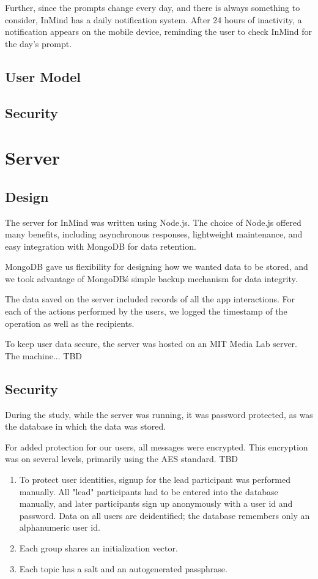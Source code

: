       Further, since the prompts change every day,
      and there is always something to consider, InMind has a daily notification system.
      After 24 hours of inactivity, a notification appears on the mobile device,
      reminding the user to check InMind for the day's prompt.

    \subsection{User Model}

    \subsection{Security}


  \section{Server}
    \subsection{Design}
      The server for InMind was written using Node.js.
      The choice of Node.js offered many benefits, including asynchronous responses,
      lightweight maintenance, and easy integration with MongoDB for data retention.

      MongoDB gave us flexibility for designing how we wanted data to be stored,
      and we took advantage of MongoDB\'s simple backup mechanism for data integrity.

      The data saved on the server included records of all the app interactions.
      For each of the actions performed by the users,
      we logged the timestamp of the operation as well as the recipients.

      To keep user data secure, the server was hosted on an MIT Media Lab server.
      The machine... TBD

    \subsection{Security}
      During the study, while the server was running, it was password protected,
      as was the database in which the data was stored.

      For added protection for our users, all messages were encrypted.
      This encryption was on several levels, primarily using the AES standard.
      TBD

      \begin{enumerate}
      \item To protect user identities, signup for the lead participant was performed manually.
      All "lead" participants had to be entered into the database manually,
      and later participants sign up anonymously with a user id and password.
      Data on all users are deidentified;
      the database remembers only an alphanumeric user id.
      \item Each group shares an initialization vector.
      \item Each topic has a salt and an autogenerated passphrase.
      \end{enumerate}



